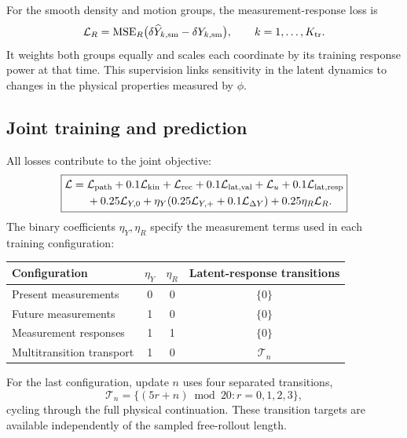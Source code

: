 \documentclass[11pt,a4paper]{article}
\numberwithin{equation}{section}
\newcommand{\MSE}{\operatorname{MSE}}
\newcommand{\sm}{\mathrm{sm}}
\begin{document}
For the smooth density and motion groups, the measurement-response loss is
\begin{equation}
\mathcal L_R=\MSE_R\bigl(\delta\widehat Y_{k,\sm}-\delta Y_{k,\sm}\bigr),
\qquad k=1,\ldots,K_{\rm tr}.
\end{equation}
It weights both groups equally and scales each coordinate by its training
response power at that time. This supervision links sensitivity in the
latent dynamics to changes in the physical properties measured by $\phi$.

\subsection{Joint training and prediction}

All losses contribute to the joint objective:
\begin{equation}
\boxed{\begin{aligned}
\mathcal L={}&\mathcal L_{\rm path}+0.1\mathcal L_{\rm kin}
+\mathcal L_{\rm rec}+0.1\mathcal L_{\rm lat,val}
+\mathcal L_u+0.1\mathcal L_{\rm lat,resp}\\
&+0.25\mathcal L_{Y,0}
+\eta_Y(0.25\mathcal L_{Y,+}+0.1\mathcal L_{\Delta Y})
+0.25\eta_R\mathcal L_R.
\end{aligned}}
\label{eq:objective}
\end{equation}
The binary coefficients $\eta_Y,\eta_R$ specify the measurement terms used
in each training configuration:
\begin{center}
\small
\begin{tabular}{@{}lccc@{}}
\toprule
Configuration & $\eta_Y$ & $\eta_R$ & Latent-response transitions\\
\midrule
Present measurements & 0 & 0 & $\{0\}$\\
Future measurements & 1 & 0 & $\{0\}$\\
Measurement responses & 1 & 1 & $\{0\}$\\
Multitransition transport & 1 & 0 & $\mathcal T_n$\\
\bottomrule
\end{tabular}
\end{center}
For the last configuration, update $n$ uses four separated transitions,
\begin{equation}
\mathcal T_n=\{(5r+n)\bmod20:r=0,1,2,3\},
\end{equation}
cycling through the full physical continuation. These transition targets
are available independently of the sampled free-rollout length.
\end{document}
